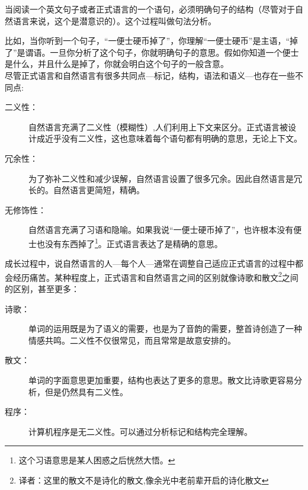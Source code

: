 \documentclass[10pt]{book}
\begin{document}
当阅读一个英文句子或者正式语言的一个语句，必须明确句子的结构（尽管对于自然语言来说，这个是潜意识的）。这个过程叫做句法分析。


比如，当你听到一个句子，“一便士硬币掉了”，你理解“一便士硬币”是主语，“掉了”是谓语。一旦你分析了这个句子，你就明确句子的意思。假如你知道一个便士是什么，并且什么是掉了，你就会明白这个句子的一般含意。\\

尽管正式语言和自然语言有很多共同点---标记，结构，语法和语义---也存在一些不同点:


\begin{description}

\item[二义性：]自然语言充满了二义性（模糊性）,人们利用上下文来区分。正式语言被设计成近乎没有二义性，这也意味着每个语句都有明确的意思，无论上下文。

\item[冗余性：]为了弥补二义性和减少误解，自然语言设置了很多冗余。因此自然语言是冗长的。自然语言更简短，精确。

\item[无修饰性：]自然语言充满了习语和隐喻。如果我说“一便士硬币掉了”，也许根本没有便士也没有东西掉了\footnote{这个习语意思是某人困惑之后恍然大悟。}。正式语言表达了是精确的意思。

\end{description}

成长过程中，说自然语言的人---每个人---通常在调整自己适应正式语言的过程中都会经历痛苦。某种程度上，正式语言和自然语言之间的区别就像诗歌和散文\footnote{译者：这里的散文不是诗化的散文,像余光中老前辈开启的诗化散文}之间的区别，甚至更多：


\begin{description}

\item[诗歌：]单词的运用既是为了语义的需要，也是为了音韵的需要，整首诗创造了一种情感共鸣。二义性不仅很常见，而且常常是故意安排的。

\item[散文：]单词的字面意思更加重要，结构也表达了更多的意思。散文比诗歌更容易分析，但是仍然具有二义性。

\item[程序：]计算机程序是无二义性。可以通过分析标记和结构完全理解。


\end{description}
\end{document}
